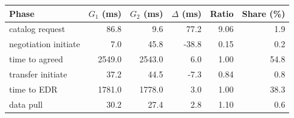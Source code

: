 \begin{tabular}{lrrrrr}
    \toprule
    Phase & $G_1$ (ms) & $G_2$ (ms) & $\Delta$ (ms) & Ratio & Share (\%) \\
    \midrule
    catalog request & 86.8 & 9.6 & 77.2 & 9.06 & 1.9 \\
    negotiation initiate & 7.0 & 45.8 & -38.8 & 0.15 & 0.2 \\
    time to agreed & 2549.0 & 2543.0 & 6.0 & 1.00 & 54.8 \\
    transfer initiate & 37.2 & 44.5 & -7.3 & 0.84 & 0.8 \\
    time to EDR & 1781.0 & 1778.0 & 3.0 & 1.00 & 38.3 \\
    data pull & 30.2 & 27.4 & 2.8 & 1.10 & 0.6 \\
    \bottomrule
\end{tabular}
